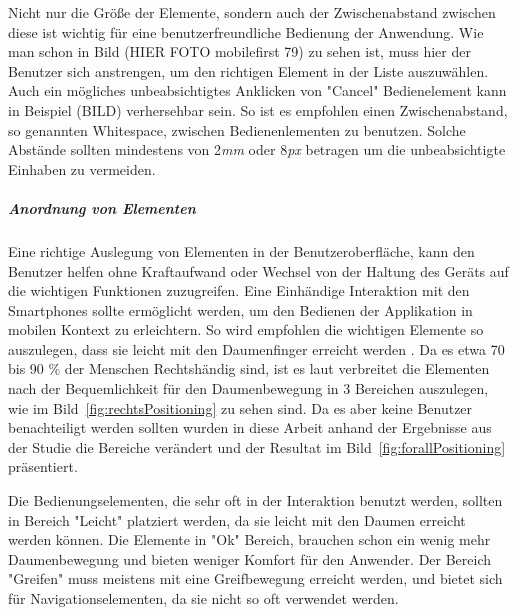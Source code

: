 Nicht nur die Größe der Elemente, sondern auch der Zwischenabstand zwischen diese ist wichtig für eine benutzerfreundliche Bedienung der Anwendung. Wie man schon in Bild (HIER FOTO mobilefirst 79) zu sehen ist, muss hier der Benutzer sich anstrengen, um den richtigen Element in der Liste auszuwählen. Auch ein mögliches unbeabsichtigtes Anklicken von "Cancel" Bedienelement kann in Beispiel (BILD) verhersehbar sein. So ist es empfohlen einen Zwischenabstand, so genannten Whitespace, zwischen Bedienenlementen zu benutzen. Solche Abstände sollten mindestens von 2\textit{mm} oder 8\textit{px} betragen\cite{lukeGUI} um die unbeabsichtigte Einhaben zu vermeiden.

\subparagraph{Anordnung von Elementen} 
\label{subp:anordnung_von_elementen}

Eine richtige Auslegung von Elementen in der Benutzeroberfläche, kann den Benutzer helfen ohne Kraftaufwand oder Wechsel von der Haltung des Geräts auf die wichtigen Funktionen zuzugreifen. Eine Einhändige Interaktion mit den Smartphones sollte ermöglicht werden, um den Bedienen der Applikation in mobilen Kontext zu erleichtern. So wird empfohlen die wichtigen Elemente so auszulegen, dass sie leicht mit den Daumenfinger erreicht werden \cite[Seite 209]{mobileFrontier}. Da es etwa 70 bis 90 $\%$ der Menschen Rechtshändig sind, ist es laut \cite[Seite 72]{mobileFirst} verbreitet die Elementen  nach der Bequemlichkeit für den Daumenbewegung in 3 Bereichen auszulegen, wie im Bild~\ref{fig:rechtsPositioning} zu sehen sind. Da es aber keine Benutzer benachteiligt werden sollten wurden in diese Arbeit anhand der Ergebnisse aus der Studie \cite{Park:2010tu} die Bereiche verändert und der Resultat im Bild~\ref{fig:forallPositioning}\cite[Seite 72]{mobileFirst} präsentiert.

Die Bedienungselementen, die sehr oft in der Interaktion benutzt werden, sollten in Bereich "Leicht" platziert werden, da sie leicht mit den Daumen erreicht werden können. Die Elemente in "Ok" Bereich, brauchen schon ein wenig mehr Daumenbewegung und bieten weniger Komfort für den Anwender. Der Bereich "Greifen" muss meistens mit eine Greifbewegung erreicht werden, und bietet sich für Navigationselementen, da sie nicht so oft verwendet werden.

